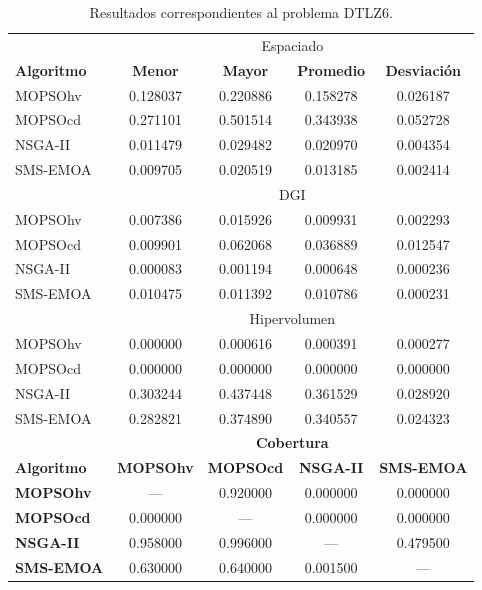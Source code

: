 \begin{table}
 \begin{center}
  \begin{tabular}{|l|cc|cc|} \hline
    & \multicolumn{4}{|c|}{Espaciado} \\ 
	\textbf{Algoritmo} & \textbf{Menor} & \textbf{Mayor} & \textbf{Promedio} & \textbf{Desviaci\'on} \\  \hline \hline
	MOPSOhv &0.128037 & 0.220886 & 0.158278 & 0.026187   \\ 
	MOPSOcd &0.271101 & 0.501514 & 0.343938 & 0.052728   \\ 
	NSGA-II &0.011479 & 0.029482 & 0.020970 & 0.004354   \\  
	SMS-EMOA & 0.009705 & 0.020519 & 0.013185 & 0.002414   \\  
	\hline\hline
    & \multicolumn{4}{|c|}{DGI} \\ 
	\hline\hline
	MOPSOhv &0.007386 & 0.015926 & 0.009931 & 0.002293  \\ 
	MOPSOcd &0.009901 & 0.062068 & 0.036889 & 0.012547  \\ 
	NSGA-II &0.000083 & 0.001194 & 0.000648 & 0.000236   \\  
	SMS-EMOA &0.010475 & 0.011392 & 0.010786 & 0.000231  \\  
	\hline\hline
    & \multicolumn{4}{|c|}{Hipervolumen} \\ 
	\hline\hline
	MOPSOhv &0.000000 & 0.000616 & 0.000391 & 0.000277    \\ 
	MOPSOcd &0.000000 & 0.000000 & 0.000000 & 0.000000  \\ 
	NSGA-II &0.303244 & 0.437448 & 0.361529 & 0.028920  \\  
	SMS-EMOA &0.282821 & 0.374890 & 0.340557 & 0.024323   \\  
	\hline\hline
	& \multicolumn{4}{|c|}{\textbf{Cobertura}} \\ \hline\hline 
	\textbf{Algoritmo} & \textbf{MOPSOhv} & \textbf{MOPSOcd} & \textbf{NSGA-II} & \textbf{SMS-EMOA} \\  \hline \hline
	\textbf{MOPSOhv} & --- &  0.920000       & 0.000000  & 0.000000 \\ 
	\textbf{MOPSOcd} & 0.000000 & ---       &  0.000000 &  0.000000  \\ 
	\textbf{NSGA-II} & 0.958000 & 0.996000  & ---       & 0.479500  \\  
	\textbf{SMS-EMOA}& 0.630000 &  0.640000 & 0.001500  & --- \\  
	\hline
	\end{tabular}
\caption{Resultados correspondientes al problema DTLZ6.}
  \label{tab:dtlz6}
\end{center}
\end{table}

